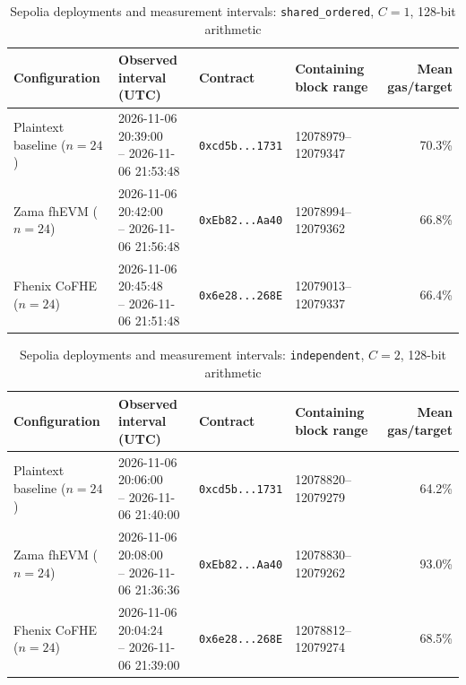 \begin{table}[!t]
\caption{Sepolia deployments and measurement intervals: \texttt{shared\_ordered}, \(C=1\), 128-bit arithmetic}
\label{tab:sepolia-experiment-deployments-concurrency-euint128-concurrency-w128-c1-shared-ordered}
\centering
\footnotesize
\setlength{\tabcolsep}{4pt}
\begin{tabular}{|l|l|l|l|r|}
\hline
\textbf{Configuration} &
\textbf{Observed interval (UTC)} &
\textbf{Contract} &
\textbf{Containing block range} &
\textbf{Mean gas/target} \\
\hline
Plaintext baseline (\(n=24\)) &
\shortstack[l]{2026-11-06 20:39:00 \\ -- 2026-11-06 21:53:48} &
\texttt{0xcd5b...1731} &
12078979--12079347 &
70.3\% \\
\hline
Zama fhEVM (\(n=24\)) &
\shortstack[l]{2026-11-06 20:42:00 \\ -- 2026-11-06 21:56:48} &
\texttt{0xEb82...Aa40} &
12078994--12079362 &
66.8\% \\
\hline
Fhenix CoFHE (\(n=24\)) &
\shortstack[l]{2026-11-06 20:45:48 \\ -- 2026-11-06 21:51:48} &
\texttt{0x6e28...268E} &
12079013--12079337 &
66.4\% \\
\hline
\end{tabular}
\end{table}

\begin{table}[!t]
\caption{Sepolia deployments and measurement intervals: \texttt{independent}, \(C=2\), 128-bit arithmetic}
\label{tab:sepolia-experiment-deployments-concurrency-euint128-concurrency-w128-c2-independent}
\centering
\footnotesize
\setlength{\tabcolsep}{4pt}
\begin{tabular}{|l|l|l|l|r|}
\hline
\textbf{Configuration} &
\textbf{Observed interval (UTC)} &
\textbf{Contract} &
\textbf{Containing block range} &
\textbf{Mean gas/target} \\
\hline
Plaintext baseline (\(n=24\)) &
\shortstack[l]{2026-11-06 20:06:00 \\ -- 2026-11-06 21:40:00} &
\texttt{0xcd5b...1731} &
12078820--12079279 &
64.2\% \\
\hline
Zama fhEVM (\(n=24\)) &
\shortstack[l]{2026-11-06 20:08:00 \\ -- 2026-11-06 21:36:36} &
\texttt{0xEb82...Aa40} &
12078830--12079262 &
93.0\% \\
\hline
Fhenix CoFHE (\(n=24\)) &
\shortstack[l]{2026-11-06 20:04:24 \\ -- 2026-11-06 21:39:00} &
\texttt{0x6e28...268E} &
12078812--12079274 &
68.5\% \\
\hline
\end{tabular}
\end{table}

